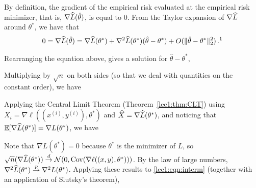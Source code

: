 By definition, the gradient of the empirical risk evaluated at the empirical risk minimizer, that is, $\nabla \widehat{L}(\hat{\theta})$, is equal to $0$. From the Taylor expansion of $\nabla \widehat{L}$ around $\theta^*$, we have that 
\begin{align}
    0 = \nabla \hatL(\hat{\theta}) = \nabla \hatL(\theta^*) + \nabla^2 \hatL(\theta^*)(\hat{\theta} - \theta^*) + O(\|\hat{\theta} - \theta^*\|^2_2)\perm\text{\footnotemark}
\end{align}

Rearranging the equation above, gives a solution for $\hat{\theta}-\theta^*$, 

Multiplying by $\sqrt{n}$ on both sides (so that we deal with quantities on the constant order), we have

 
Applying the Central Limit Theorem (Theorem~\ref{lec1:thm:CLT}) using $X_i = \nabla \ell ((x^{(i)}, y^{(i)}), \theta^*)$ and $\widehat{X} = \nabla \widehat{L}(\theta^*)$, and noticing that $\operatorname*{\mathbb{E}}[\nabla \widehat{L}(\theta^{*})] = \nabla L(\theta^{*})$, we have
 
Note that $\nabla L(\theta^{*}) = 0$ because $\theta^{*}$ is the minimizer of  $L$, so $\sqrt{n} (\nabla \widehat{L}(\theta^{*})) \overset{d}{\to} \mathcal{N}(0,\operatorname{Cov}(\nabla \ell((x, y), \theta^{*})))$. By the law of large numbers, $\nabla^2 \widehat{L}(\theta^*) \stackrel{p}{\rightarrow} \nabla^2 L(\theta^*)$. Applying these results to \eqref{lec1:eqn:interm} (together with an application of Slutsky's theorem),

